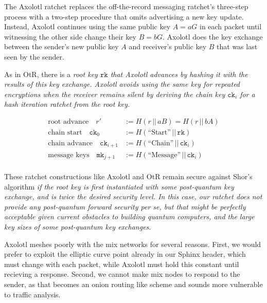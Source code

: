 \documentclass[twoside,letterpaper]{llncs}
\def\mathcomma{,}
\def\mathcomma{}
\begin{document}

\def\ck{\texttt{ck}}
\def\rk{\texttt{rk}}
\def\mk{\texttt{mk}}

The Axolotl ratchet \cite{Axolotl??} replaces the off-the-record
messaging ratchet's three-step process with a two-step procedure
that omits advertising a new key update.  Instead, Axolotl continues
using the same public key $A = a G$ in each packet until witnessing
the other side change their key $B = b G$.  Axolotl does the key
exchange between the sender's new public key $A$ and receiver's
public key $B$ that was last seen by the sender.

As in OtR, there is a \em{root key} $\rk$ that Axolotl advances by
hashing it with the results of this key exchange.  Axolotl avoids using the same key for
repeated encryptions when the receiver remains silent by deriving the
\em{chain key} $\ck_i$ for a hash iteration ratchet from the root key.

\[ \begin{aligned}
\textrm{root advance}\quad
r' &:= H(r \,||\, a B) = H(r \,||\, b A) \\ %
\textrm{chain start}\quad
 \ck_0 &:= H(\textrm{``Start''} \,||\, \rk) \\
\textrm{chain advance}\quad
 \ck_{i+1} &:= H(\textrm{``Chain''} \,||\, \ck_i)  \\
\textrm{message keys}\quad
 \mk_{j+1} &:= H(\textrm{``Message''} \,||\, \ck_i)  \\
\end{aligned} \]

These ratchet constructions like Axolotl and OtR remain secure against
Shor's algorithm \em{if} the root key is first instantiated with some
post-quantum key exchange, and is twice the desired security level. 
In this case, our ratchet does not provide any post-quantum forward
security per se, but that might be perfectly acceptable given current
obstacles to building quantum computers, and the large key sizes of
some post-quantum key exchanges. 


Axolotl meshes poorly with the mix networks for several reasons.
%
First, we would prefer to exploit the elliptic curve point
 already in our Sphinx header, which must change with each packet,
while Axolotl must hold this constant until recieving a response.
%
Second, we cannot make mix nodes to respond to the sender, as that
becomes an onion routing like scheme and sounds more vulnerable to
traffic analysis.

\def\cn{\texttt{cn}}
\def\DH{\texttt{DH}}
\def\lk{\texttt{lk}}
\def\sk{\texttt{sk}}
\def\ECDH{\textrm{ECDH}}
\end{document}
